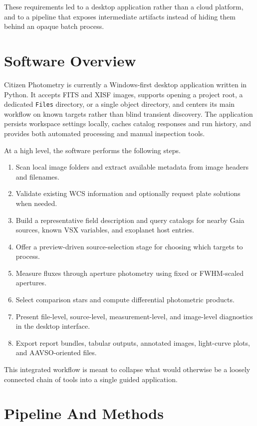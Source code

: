 \documentclass[modern]{aastex701}
\begin{document}
These requirements led to a desktop application rather than a cloud platform, and to a pipeline that exposes intermediate artifacts instead of hiding them behind an opaque batch process.

\section{Software Overview}\label{sec:overview}

Citizen Photometry is currently a Windows-first desktop application written in Python. It accepts FITS and XISF images, supports opening a project root, a dedicated \texttt{Files} directory, or a single object directory, and centers its main workflow on known targets rather than blind transient discovery. The application persists workspace settings locally, caches catalog responses and run history, and provides both automated processing and manual inspection tools.

At a high level, the software performs the following steps.

\begin{enumerate}
\item Scan local image folders and extract available metadata from image headers and filenames.
\item Validate existing WCS information and optionally request plate solutions when needed.
\item Build a representative field description and query catalogs for nearby Gaia sources, known VSX variables, and exoplanet host entries.
\item Offer a preview-driven source-selection stage for choosing which targets to process.
\item Measure fluxes through aperture photometry using fixed or FWHM-scaled apertures.
\item Select comparison stars and compute differential photometric products.
\item Present file-level, source-level, measurement-level, and image-level diagnostics in the desktop interface.
\item Export report bundles, tabular outputs, annotated images, light-curve plots, and AAVSO-oriented files.
\end{enumerate}

This integrated workflow is meant to collapse what would otherwise be a loosely connected chain of tools into a single guided application.

\section{Pipeline And Methods}\label{sec:methods}
\end{document}
